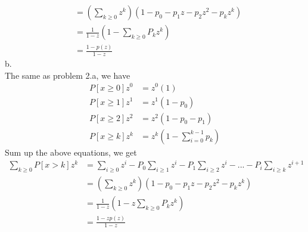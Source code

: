 \documentclass{article}
\begin{document}
\begin{enumerate}
\begin{align*}
&=(\sum_{k\geq 0}z^k)(1-p_0-p_1z-p_2z^2-p_kz^k) \\
&=\frac{1}{1-z}(1-\sum_{k\geq 0}P_kz^k) \\
&=\frac{1-p(z)}{1-z}
\end{align*}
b. \\
The same as problem 2.a, we have
\begin{align*}
P[x\geq 0]z^0&=z^0(1) \\
P[x\geq 1]z^1&=z^1(1-p_0) \\
P[x\geq 2]z^2&=z^2(1-p_0-p_1) \\
P[x\geq k]z^k&=z^k(1-\sum_{i=0}^{k-1}p_k) 
\end{align*}
Sum up the above equations, we get
\begin{align*}
\sum_{k\geq 0}P[x>k]z^k&=\sum_{i\geq 0}z^i-P_0\sum_{i\geq 1}z^i-P_1\sum_{i\geq 2}z^i-...-P_i\sum_{i\geq k}z^{i+1} \\
&=(\sum_{k\geq 0}z^k)(1-p_0-p_1z-p_2z^2-p_kz^k) \\
&=\frac{1}{1-z}(1-z\sum_{k\geq 0}P_kz^k) \\
&=\frac{1-zp(z)}{1-z}
\end{align*}
\end{enumerate}
\end{document}

